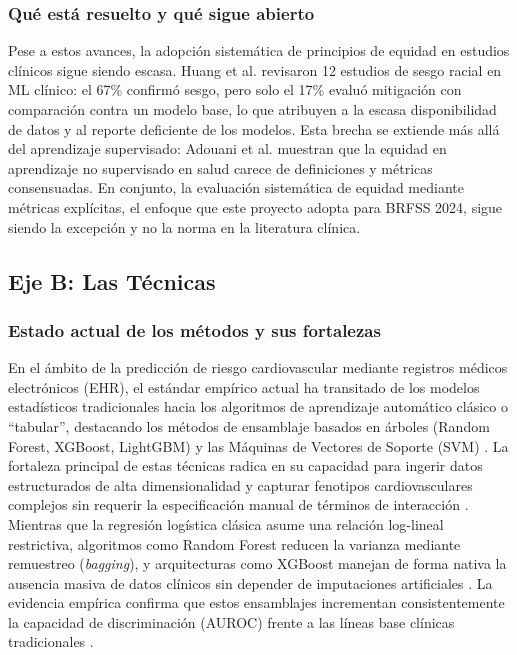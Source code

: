 \documentclass[conference]{IEEEtran}
\begin{document}
\subsubsection{Qué está resuelto y qué sigue abierto}

Pese a estos avances, la adopción sistemática de principios de equidad en estudios clínicos sigue siendo escasa. Huang et al. \cite{huang2022evaluation} revisaron 12 estudios de sesgo racial en ML clínico: el 67\% confirmó sesgo, pero solo el 17\% evaluó mitigación con comparación contra un modelo base, lo que atribuyen a la escasa disponibilidad de datos y al reporte deficiente de los modelos. Esta brecha se extiende más allá del aprendizaje supervisado: Adouani et al. \cite{adouani2026rethinking} muestran que la equidad en aprendizaje no supervisado en salud carece de definiciones y métricas consensuadas. En conjunto, la evaluación sistemática de equidad mediante métricas explícitas, el enfoque que este proyecto adopta para BRFSS 2024, sigue siendo la excepción y no la norma en la literatura clínica.


\subsection{Eje B: Las Técnicas}

\subsubsection{Estado actual de los métodos y sus fortalezas}

En el ámbito de la predicción de riesgo cardiovascular mediante registros médicos electrónicos (EHR), el estándar empírico actual ha transitado de los modelos estadísticos tradicionales hacia los algoritmos de aprendizaje automático clásico o ``tabular'', destacando los métodos de ensamblaje basados en árboles (Random Forest, XGBoost, LightGBM) y las Máquinas de Vectores de Soporte (SVM) \cite{li2023evaluating, davoudi2024fairness}. La fortaleza principal de estas técnicas radica en su capacidad para ingerir datos estructurados de alta dimensionalidad y capturar fenotipos cardiovasculares complejos sin requerir la especificación manual de términos de interacción \cite{foryciarz2022evaluating}. Mientras que la regresión logística clásica asume una relación log-lineal restrictiva, algoritmos como Random Forest reducen la varianza mediante remuestreo (\textit{bagging}), y arquitecturas como XGBoost manejan de forma nativa la ausencia masiva de datos clínicos sin depender de imputaciones artificiales \cite{li2023evaluating}. La evidencia empírica confirma que estos ensamblajes incrementan consistentemente la capacidad de discriminación (AUROC) frente a las líneas base clínicas tradicionales \cite{cho2021preexisting}.
\end{document}
